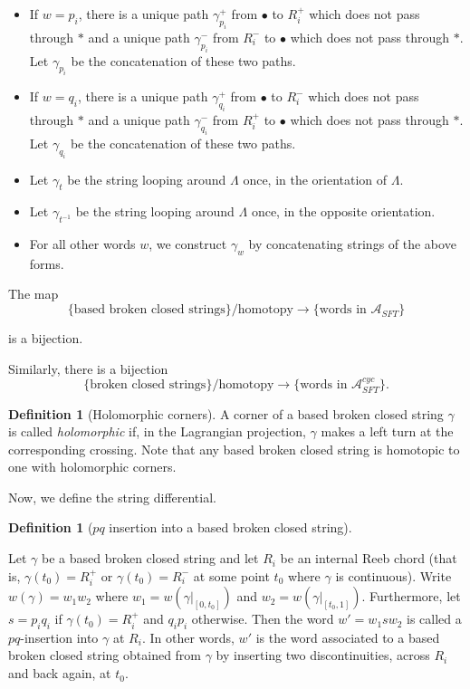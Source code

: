 \documentclass[a4paper,final, reqno]{amsart}
\theoremstyle{plain}
\theoremstyle{definition}
\newtheorem{Def}[Th]{Definition}
\newcommand{\A}{\mathcal{A}}
\begin{document}
	\begin{itemize}
		\item If $w=p_i$, there is a unique path $\gamma_{p_i}^+$ from $\bullet$ to $R_i^+$ which does not pass through $*$ and a unique path $\gamma_{p_i}^-$ from $R_i^-$ to $\bullet$ which does not pass through $*$. Let $\gamma_{p_i}$ be the concatenation of these two paths.
		\item If $w=q_i$, there is a unique path $\gamma_{q_i}^+$ from $\bullet$ to $R_i^-$ which does not pass through $*$ and a unique path $\gamma_{q_i}^-$ from $R_i^+$ to $\bullet$ which does not pass through $*$. Let $\gamma_{q_i}$ be the concatenation of these two paths.
		\item Let $\gamma_{t}$ be the string looping around $\Lambda$ once, in the orientation of $\Lambda$.
		\item Let $\gamma_{t^{-1}}$ be the string looping around $\Lambda$ once, in the opposite orientation.
		\item For all other words $w$, we construct $\gamma_w$ by concatenating strings of the above forms.
	\end{itemize}
	
	The map 
	\[ \{ \text{based broken closed strings} \} / \text{homotopy} \to \{ \text{words in } \A_{SFT} \}\]
	
	is a bijection.
	
	Similarly, there is a bijection
	\[ \{ \text{broken closed strings}\} / \text{homotopy} \to \{\text{words in } \A_{SFT}^{cyc}\}. \]
	
	
	\begin{Def}[Holomorphic corners]
		A corner of a based broken closed string $\gamma$ is called \emph{holomorphic} if, in the Lagrangian projection, $\gamma$ makes a left turn at the corresponding crossing. Note that any based broken closed string is homotopic to one with holomorphic corners.
	\end{Def}
	
	
	
	Now, we define the string differential.
	
	\begin{Def}[$pq$ insertion into a based broken closed string]
		
		\-\
		
		Let $\gamma$ be a based broken closed string and let $R_i$ be an internal Reeb chord (that is, $\gamma(t_0) = R_i^+$ or $\gamma(t_0) = R_i^-$ at some point $t_0$ where $\gamma$ is continuous). Write $w(\gamma) = w_1w_2$ where $w_1 = w(\gamma|_{[0,t_0]})$ and $w_2 = w(\gamma|_{[t_0,1]})$. Furthermore, let $s = p_iq_i$ if $\gamma(t_0) = R_i^+$ and $q_ip_i$ otherwise. Then the word $w' = w_1sw_2$ is called a $pq$-insertion into $\gamma$ at $R_i$. In other words, $w'$ is the word associated to a based broken closed string obtained from $\gamma$ by inserting two discontinuities, across $R_i$ and back again, at $t_0$. 
	\end{Def}
	
\end{document}
